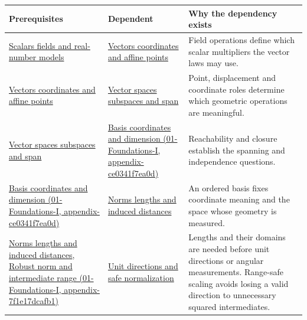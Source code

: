 {\def\LTcaptype{none} %
\begin{longtable}[]{@{}
  >{\raggedright\arraybackslash}p{}
  >{\raggedright\arraybackslash}p{}
  >{\raggedright\arraybackslash}p{}@{}}
\toprule\noalign{}
\begin{minipage}[b]{\linewidth}\raggedright
Prerequisites
\end{minipage} & \begin{minipage}[b]{\linewidth}\raggedright
Dependent
\end{minipage} & \begin{minipage}[b]{\linewidth}\raggedright
Why the dependency exists
\end{minipage} \\
\midrule\noalign{}
\endhead
\bottomrule\noalign{}
\endlastfoot
\hyperref[appendix-52051ad550fe]{Scalars fields and real-number models} & \hyperref[appendix-0659864c0aa3]{Vectors coordinates and affine points} & Field operations define which scalar multipliers the vector laws may use. \\
\hyperref[appendix-0659864c0aa3]{Vectors coordinates and affine points} & \hyperref[appendix-173b52c063ae]{Vector spaces subspaces and span} & Point, displacement and coordinate roles determine which geometric operations are meaningful. \\
\hyperref[appendix-173b52c063ae]{Vector spaces subspaces and span} & \href{../01-Foundations-I/main.pdf\#nameddest=appendix-ce0341f7ea0d}{Basis coordinates and dimension (01-Foundations-I, appendix-ce0341f7ea0d)} & Reachability and closure establish the spanning and independence questions. \\
\href{../01-Foundations-I/main.pdf\#nameddest=appendix-ce0341f7ea0d}{Basis coordinates and dimension (01-Foundations-I, appendix-ce0341f7ea0d)} & \hyperref[appendix-49933872bb51]{Norms lengths and induced distances} & An ordered basis fixes coordinate meaning and the space whose geometry is measured. \\
\hyperref[appendix-49933872bb51]{Norms lengths and induced distances}, \href{../01-Foundations-I/main.pdf\#nameddest=appendix-7f1e17dcafb1}{Robust norm and intermediate range (01-Foundations-I, appendix-7f1e17dcafb1)} & \hyperref[appendix-f744e41b95b4]{Unit directions and safe normalization} & Lengths and their domains are needed before unit directions or angular measurements. Range-safe scaling avoids losing a valid direction to unnecessary squared intermediates. \\

\end{longtable}}
